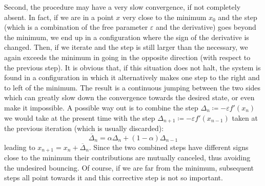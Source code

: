 Second, the procedure may have a very slow convergence, if not completely absent. In fact, if we are in a point $x$ very close to the minimum $x_0$ and the step (which is a combination of the free parameter $\varepsilon$ and the derivative) goes beyond the minimum, we end up in a configuration where the sign of the derivative is changed. Then, if we iterate and the step is still larger than the necessary, we again exceeds the minimum in going in the opposite direction (with respect to the previous step). It is obvious that, if this situation does not halt, the system is found in a configuration in which it alternatively makes one step to the right and to left of the minimum. The result is a continuous jumping between the two sides which can greatly slow down the convergence towards the desired state, or even make it impossible. A possible way out is to combine the step $\Delta_n\coloneqq-\varepsilon f'(x_n)$ we would take at the present time with the step $\Delta_{n+1}\coloneqq-\varepsilon f'(x_{n-1})$ taken at the previous iteration (which is usually discarded):
\begin{equation}
\overline{\Delta}_n=\alpha\Delta_n+(1-\alpha)\Delta_{n-1}
\end{equation}
leading to $x_{n+1}=x_n+\overline{\Delta}_n$. Since the two combined steps have different signs close to the minimum their contributions are mutually canceled, thus avoiding the undesired bouncing. Of course, if we are far from the minimum, subsequent steps all point towards it and this corrective step is not so important.

